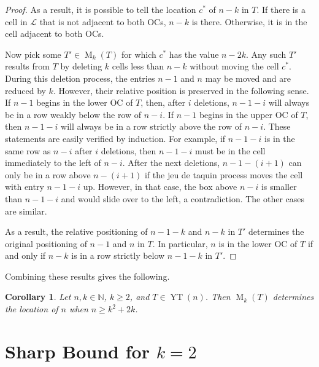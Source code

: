 \documentclass[12pt]{amsart}
\newtheorem{corollary}[theorem]{Corollary}
\theoremstyle{definition}
\theoremstyle{remark}
\numberwithin{equation}{section}
\numberwithin{figure}{section}
\newcommand{\YT}{\operatorname{YT}}
\newcommand{\M}{\operatorname{M}}
\newcommand{\N}{\mathbb{N}}
\begin{document}
\begin{proof}
    As a result, it is possible to tell the location $c^*$ of $n-k$ in $T$. If there is a cell in $\mathcal{L}$ that is not adjacent to both OCs, $n-k$ is there. Otherwise, it is in the cell adjacent to both OCs.

    Now pick some $T'\in\M_k(T)$ for which $c^*$ has the value $n-2k$. Any such $T'$ results from $T$ by deleting $k$ cells less than $n-k$ without moving the cell $c^*$. During this deletion process, the entries $n-1$ and $n$ may be moved and are reduced by $k$. However, their relative position is preserved in the following sense.
    If $n-1$ begins in the lower OC of $T$, then, after $i$ deletions, $n-1-i$ will always be in a row weakly below the row of $n-i$. If $n-1$ begins in the upper OC of $T$, then $n-1-i$ will always be in a row strictly above the row of $n-i$. These statements are easily verified by induction.
    For example, if $n-1-i$ is in the same row as $n-i$ after $i$ deletions, then $n-1-i$ must be in the cell immediately to the left of $n-i$. After the next deletions, $n-1-(i+1)$ can only be in a row above $n-(i+1)$ if the jeu de taquin process moves the cell with entry $n-1-i$ up.
    However, in that case, the box above $n-i$ is smaller than $n-1-i$ and would slide over to the left, a contradiction. The other cases are similar.

    As a result, the relative positioning of $n-1-k$ and $n-k$ in $T'$ determines the original positioning of $n-1$ and $n$ in $T$. In particular, $n$ is in the lower OC of $T$ if and only if $n-k$ is in a row strictly below $n-1-k$ in $T'$.
\end{proof}


Combining these results gives the following.


\begin{corollary} \label{cor: location of n}
    Let $n,k\in\N$, $k\ge 2$, and $T\in\YT(n)$.
    Then $\M_k(T)$ determines the location of $n$ when $n \geq k^2 + 2k$.
\end{corollary}













\section{Sharp Bound for $k=2$}
\label{sec:sharp bound k=2}
	
\end{document}
